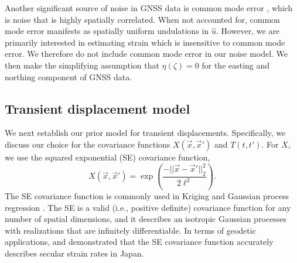 \documentclass[10pt,letter]{article}
\begin{document}
Another significant source of noise in GNSS data is common mode error \citep[e.g.,][]{Wdowinski1997,Dong2006}, which is noise that is highly spatially correlated. When not accounted for, common mode error manifests as spatially uniform undulations in $\hat{u}$. However, we are primarily interested in estimating strain which is insensitive to common mode error. We therefore do not include common mode error in our noise model. We then make the simplifying assumption that $\eta(\zeta) = 0$ for the easting and northing component of GNSS data.            

\subsection{Transient displacement model}\label{sec:SignalModel}
We next establish our prior model for transient displacements. Specifically, we discuss our choice for the covariance functions $X(\vec{x},\vec{x}')$ and $T(t,t')$. For $X$, we use the squared exponential (SE) covariance function,
\begin{equation}\label{eq:SE}
X(\vec{x},\vec{x}') = \exp\left(\frac{-||\vec{x} - \vec{x}'||_2^2}{2 \ell^2}\right).
\end{equation}
The SE covariance function is commonly used in Kriging \citep[e.g,][]{Cressie1992} and Gaussian process regression \citep[e.g.,][]{Rasmussen2006}.  The SE is a valid (i.e., positive definite) covariance function for any number of spatial dimensions, and it describes an isotropic Gaussian processes with realizations that are infinitely differentiable. In terms of geodetic applications, \citet{Kato1998} and \cite{El-Fiky1999} demonstrated that the SE covariance function accurately describes secular strain rates in Japan.  
\end{document}
